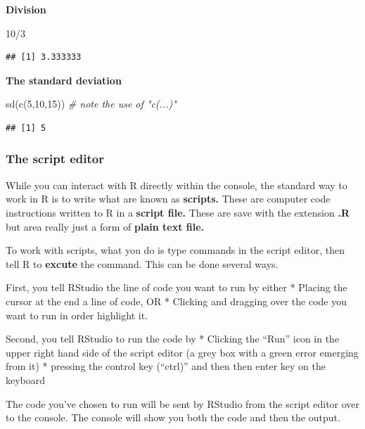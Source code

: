 \documentclass[
]{book}
\newenvironment{Shaded}{\begin{snugshade}}{\end{snugshade}}
\newcommand{\CommentTok}[1]{\textcolor[rgb]{0.56,0.35,0.01}{\textit{#1}}}
\newcommand{\DecValTok}[1]{\textcolor[rgb]{0.00,0.00,0.81}{#1}}
\newcommand{\FunctionTok}[1]{\textcolor[rgb]{0.00,0.00,0.00}{#1}}
\newcommand{\NormalTok}[1]{#1}
\newcommand{\SpecialCharTok}[1]{\textcolor[rgb]{0.00,0.00,0.00}{#1}}
\begin{document}
\textbf{Division}

\begin{Shaded}
\begin{Highlighting}[]
\DecValTok{10}\SpecialCharTok{/}\DecValTok{3}
\end{Highlighting}
\end{Shaded}

\begin{verbatim}
## [1] 3.333333
\end{verbatim}

\textbf{The standard deviation}

\begin{Shaded}
\begin{Highlighting}[]
\FunctionTok{sd}\NormalTok{(}\FunctionTok{c}\NormalTok{(}\DecValTok{5}\NormalTok{,}\DecValTok{10}\NormalTok{,}\DecValTok{15}\NormalTok{)) }\CommentTok{\# note the use of "c(...)"}
\end{Highlighting}
\end{Shaded}

\begin{verbatim}
## [1] 5
\end{verbatim}

\hypertarget{the-script-editor}{%
\subsubsection{The script editor}\label{the-script-editor}}

While you can interact with R directly within the console, the standard way to work in R is to write what are known as \textbf{scripts.} These are computer code instructions written to R in a \textbf{script file.} These are save with the extension \textbf{.R} but area really just a form of \textbf{plain text file.}

To work with scripts, what you do is type commands in the script editor, then tell R to \textbf{excute} the command. This can be done several ways.

First, you tell RStudio the line of code you want to run by either
* Placing the cursor at the end a line of code, OR
* Clicking and dragging over the code you want to run in order highlight it.

Second, you tell RStudio to run the code by
* Clicking the ``Run'' icon in the upper right hand side of the script editor (a grey box with a green error emerging from it)
* pressing the control key (``ctrl)'' and then then enter key on the keyboard

The code you've chosen to run will be sent by RStudio from the script editor over to the console. The console will show you both the code and then the output.
\end{document}

